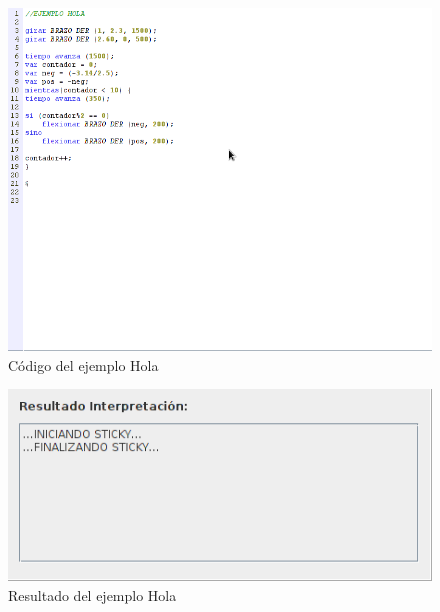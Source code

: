 \documentclass[a4paper, 12pt]{book}
\begin{document}
\begin{itemize}
  
\begin{figure}[htb]
  \centerline{\includegraphics[width=\textwidth]{./imagenes/hola-codigo.png}}
  \caption{Código del ejemplo Hola}
\end{figure}


\begin{figure}[htb]
  \centerline{\includegraphics[width=\textwidth]{./imagenes/hola-resultado.png}}
\caption{Resultado del ejemplo Hola}
\end{figure}



\end{itemize}
\end{document}
